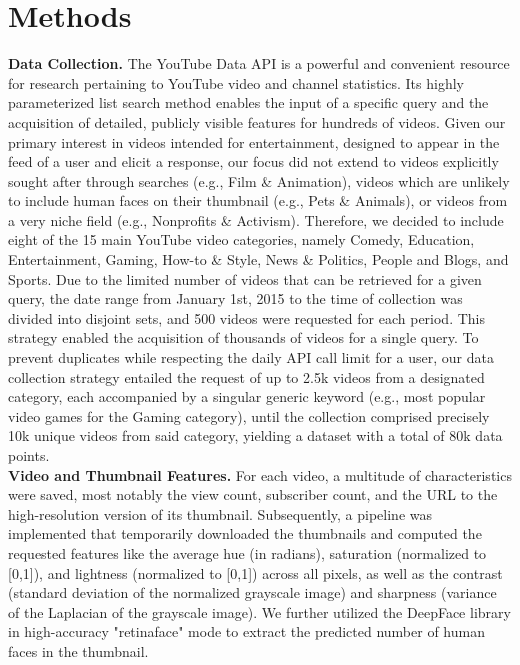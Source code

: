 \documentclass{article}
\begin{document}
\section{Methods}
\textbf{Data Collection.} The YouTube Data API \cite{youtubeapi} is a powerful and convenient resource for research pertaining to YouTube video and channel statistics. Its highly parameterized list search method enables the input of a specific query and the acquisition of detailed, publicly visible features for hundreds of videos. Given our primary interest in videos intended for entertainment, designed to appear in the feed of a user and elicit a response, our focus did not extend to videos explicitly sought after through searches (e.g., Film \& Animation), videos which are unlikely to include human faces on their thumbnail (e.g., Pets \& Animals), or videos from a very niche field (e.g., Nonprofits \& Activism). Therefore, we decided to include eight of the 15 main YouTube video categories, namely Comedy, Education, Entertainment, Gaming, How-to \& Style, News \& Politics, People and Blogs, and Sports. Due to the limited number of videos that can be retrieved for a given query, the date range from January 1st, 2015 to the time of collection was divided into disjoint sets, and 500 videos were requested for each period. This strategy enabled the acquisition of thousands of videos for a single query. To prevent duplicates while respecting the daily API call limit for a user, our data collection strategy entailed the request of up to 2.5k videos from a designated category, each accompanied by a singular generic keyword (e.g., most popular video games for the Gaming category), until the collection comprised precisely 10k unique videos from said category, yielding a dataset with a total of 80k data points.\\
\textbf{Video and Thumbnail Features.} For each video, a multitude of characteristics were saved, most notably the view count, subscriber count, and the URL to the high-resolution version of its thumbnail. Subsequently, a pipeline was implemented that temporarily downloaded the thumbnails and computed the requested features like the average hue (in radians), saturation (normalized to [0,1]), and lightness (normalized to [0,1]) across all pixels, as well as the contrast (standard deviation of the normalized grayscale image) and sharpness (variance of the Laplacian of the grayscale image). We further utilized the DeepFace library \cite{serengil2024lightface,serengil2020lightface} in high-accuracy "retinaface" mode to extract the predicted number of human faces in the thumbnail.\\
\end{document}
